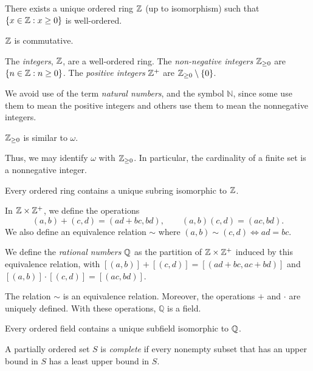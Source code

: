   \begin{thm}
    There exists a unique ordered ring $\mathbb{Z}$ (up to isomorphism) such that $\{x\in
      \mathbb{Z}:x\ge 0\}$ is well-ordered.

    $\mathbb{Z}$ is commutative.
  \end{thm}
  \begin{defn}
    The \emph{integers}, $\mathbb{Z}$, are a well-ordered ring. The \emph{non-negative
      integers} $\mathbb{Z}_{\ge 0}$ are $\{n\in\mathbb{Z}: n\ge 0\}$. The \emph{positive
      integers} $\mathbb{Z}^+$ are $\mathbb{Z}_{\ge 0}\setminus \{0\}$.
  \end{defn}
  \begin{rem}
    We avoid use of the term \emph{natural numbers}, and the symbol $\mathbb N$, since
    some use them to mean the positive integers and others use them to mean the
    nonnegative integers.
  \end{rem}
  \begin{prop}
    $\mathbb{Z}_{\ge 0}$ is similar to $\omega$.
  \end{prop}
  \begin{rem}
    Thus, we may identify $\omega$ with $\mathbb{Z}_{\ge 0}$. In particular, the
    cardinality of a finite set is a nonnegative integer.
  \end{rem}
  \begin{prop}
    Every ordered ring contains a unique subring isomorphic to $\mathbb{Z}$.
  \end{prop}
  \begin{defn}
    In $\mathbb{Z}\times\mathbb{Z}^+$, we define the operations
    \[(a,b)+(c,d)=(ad+bc,bd),\qquad (a,b)(c,d)=(ac,bd).\]
    We also define an equivalence relation $\sim$ where
    $(a,b)\sim (c,d)\iff ad=bc$.

    We define the \emph{rational numbers} $\mathbb{Q}$ as the partition
    of $\mathbb{Z}\times\mathbb{Z}^+$ induced by this equivalence relation, with
    $[(a,b)]+[(c,d)]=[(ad+bc,ac+bd)]$ and $[(a,b)]\cdot [(c,d)]=[(ac,bd)]$.
  \end{defn}
  \begin{prop}
    The relation $\sim$ is an equivalence relation. Moreover, the operations $+$
    and $\cdot$ are uniquely defined. With these operations, $\mathbb Q$ is a
    field.
  \end{prop}
  \begin{prop}
    Every ordered field contains a unique subfield isomorphic to $\mathbb{Q}$.
  \end{prop}
  \begin{defn}
    A partially ordered set $S$ is \emph{complete} if every nonempty subset that has
    an upper bound in $S$ has a least upper bound in $S$.
  \end{defn}
